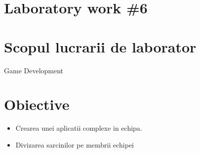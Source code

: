 \section*{Laboratory work \#6}

\section{Scopul lucrarii de laborator}
Game Development\\
\section{Obiective}
\begin{itemize}
\item Crearea unei aplicatii complexe in echipa.
\item Divizarea sarcinilor pe membrii echipei
\end{itemize}
\clearpage